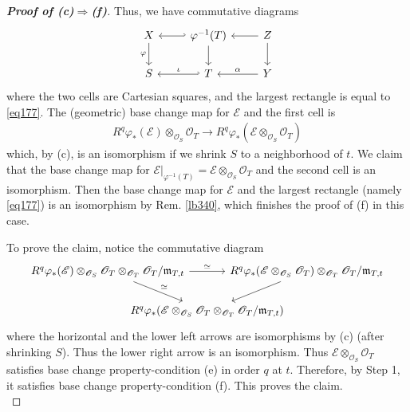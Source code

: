 \documentclass[12pt,b5paper,notitlepage]{report}
\theoremstyle{definition}
\theoremstyle{plain}
\newcommand{\scr}{\mathscr}
\newcommand{\mk}{\mathfrak m}
\numberwithin{equation}{section}
\begin{document}
\begin{proof}[\textbf{Proof of (c)$\Rightarrow$(f)}]
Thus, we have commutative diagrams
\begin{equation*}
\begin{tikzcd}
X \arrow[d, "\varphi"'] & \varphi^{-1}(T) \arrow[l,hook'] \arrow[d] &Z \arrow[l] \arrow[d]\\
S                       & T \arrow[l,hook', "\iota"']                             &Y \arrow[l,"\alpha"']
\end{tikzcd}
\end{equation*}
where the two cells are Cartesian squares, and the largest rectangle is equal to \eqref{eq177}. The (geometric) base change map for $\scr E$ and the first cell is
\begin{align*}
R^q\varphi_*(\scr E)\otimes_{\scr O_S}\scr O_T\rightarrow R^q\varphi_*(\scr E\otimes_{\scr O_S}\scr O_T)
\end{align*}
which, by (c), is an isomorphism if we shrink $S$ to a neighborhood of $t$. We claim that the base change map for $\scr E|_{\varphi^{-1}(T)}=\scr E\otimes_{\scr O_S}\scr O_T$ and the second cell is an isomorphism. Then the base change map for $\scr E$ and the largest rectangle (namely \eqref{eq177}) is an isomorphism by Rem. \ref{lb340}, which finishes the proof of (f) in this case.

To prove the claim, notice the commutative diagram
\begin{equation*}
\begin{tikzcd}[column sep=-2cm]
R^q\varphi_*(\scr E)\otimes_{\scr O_S}\scr O_T\otimes_{\scr O_T} \scr O_T/\mk_{T,t} \arrow[rr,"\simeq"] \arrow[rd,"\simeq"] &              & R^q\varphi_*(\scr E\otimes_{\scr O_S}\scr O_T)\otimes_{\scr O_T} \scr O_T/\mk_{T,t} \\
                        & R^q\varphi_*(\scr E\otimes_{\scr O_S}\scr O_T\otimes_{\scr O_T} \scr O_T/\mk_{T,t}) \arrow[from=ru] &  
\end{tikzcd}
\end{equation*}
where the horizontal and the lower left arrows are isomorphisms by (c) (after shrinking $S$). Thus the lower right arrow is an isomorphism. Thus $\scr E\otimes_{\scr O_S}\scr O_T$ satisfies base change property-condition (e) in order $q$ at $t$. Therefore, by Step 1, it satisfies base change property-condition (f). This proves the claim.\\


\end{proof}
\end{document}
